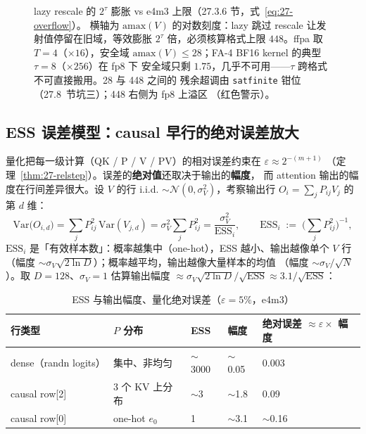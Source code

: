 \begin{figure}[H]
\caption{lazy rescale 的 $2^{\tau}$ 膨胀 vs e4m3 上限（27.3.6 节，式~\eqref{eq:27-overflow}）。
横轴为 $\mathrm{amax}(V)$ 的对数刻度：lazy 跳过 rescale 让发射值停留在旧域，等效膨胀
$2^{\tau}$ 倍，必须核算格式上限 $448$。ffpa 取 $T=4$（$\times16$），安全域
$\mathrm{amax}(V)\le 28$；FA-4 BF16 kernel 的典型 $\tau=8$（$\times256$）在 fp8 下
安全域只剩 $1.75$，几乎不可用——$\tau$ 跨格式不可直接搬用。28 与 448 之间的
残余超调由 \texttt{satfinite} 钳位（27.8~节坑三）；448 右侧为 fp8 上溢区
（红色警示）。}
\label{fig:27-lazy-rescale}
\end{figure}

\subsection{ESS 误差模型：causal 早行的绝对误差放大}

量化把每一级计算（QK / P / V / PV）的相对误差约束在 $\varepsilon \approx 2^{-(m+1)}$
（定理~\ref{thm:27-relstep}）。误差的\textbf{绝对值}还取决于输出的\textbf{幅度}，
而 attention 输出的幅度在行间差异很大。设 $V$ 的行 i.i.d. $\sim
\mathcal{N}(0, \sigma_V^2)$，考察输出行 $O_i = \sum_j P_{ij} V_j$ 的第 $d$ 维：
\begin{equation}
  \mathrm{Var}\big(O_{i,d}\big)
  = \sum_j P_{ij}^2\, \mathrm{Var}(V_{j,d})
  = \sigma_V^2 \sum_j P_{ij}^2
  = \frac{\sigma_V^2}{\mathrm{ESS}_i},
  \qquad
  \mathrm{ESS}_i \;\mathrel{:=}\; \Big(\sum_j P_{ij}^2\Big)^{-1},
  \label{eq:27-ess}
\end{equation}
$\mathrm{ESS}_i$ 是「有效样本数」：概率越集中（one-hot），ESS 越小、输出越像单个
$V$ 行（幅度 $\sim \sigma_V\sqrt{2\ln D}$）；概率越平均，输出越像大量样本的均值
（幅度 $\sim \sigma_V / \sqrt{N}$）。取 $D{=}128$、$\sigma_V{=}1$ 估算输出幅度
$\approx \sigma_V \sqrt{2 \ln D} / \sqrt{\mathrm{ESS}} \approx 3.1/\sqrt{\mathrm{ESS}}$：

\begin{table}[htbp]
  \centering
  \caption{ESS 与输出幅度、量化绝对误差（$\varepsilon = 5\%$，e4m3）}
  \label{tab:27-ess}
  \begin{tabular}{lllll}
    \toprule
    行类型 & $P$ 分布 & ESS & 幅度 & 绝对误差 $\approx \varepsilon \times$ 幅度 \\
    \midrule
    dense（randn logits） & 集中、非均匀 & $\sim$3000 & $\sim$0.05 & 0.003 \\
    causal row[2] & 3 个 KV 上分布 & $\sim$3 & $\sim$1.8 & 0.09 \\
    causal row[0] & one-hot $e_0$ & 1 & $\sim$3.1 & $\sim$0.16 \\
    \bottomrule
  \end{tabular}
\end{table}

